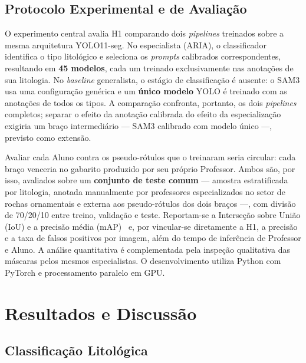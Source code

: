 \documentclass[10pt,conference]{IEEEtran}
\begin{document}
\subsection{Protocolo Experimental e de Avaliação}

O experimento central avalia H1 comparando dois \textit{pipelines} treinados sobre a mesma arquitetura YOLO11-seg. No especialista (ARIA), o classificador identifica o tipo litológico e seleciona os \textit{prompts} calibrados correspondentes, resultando em \textbf{45 modelos}, cada um treinado exclusivamente nas anotações de sua litologia. No \textit{baseline} generalista, o estágio de classificação é ausente: o SAM3 usa uma configuração genérica e um \textbf{único modelo} YOLO é treinado com as anotações de todos os tipos. A comparação confronta, portanto, os dois \textit{pipelines} completos; separar o efeito da anotação calibrada do efeito da especialização exigiria um braço intermediário --- SAM3 calibrado com modelo único ---, previsto como extensão.

Avaliar cada Aluno contra os pseudo-rótulos que o treinaram seria circular: cada braço venceria no gabarito produzido por seu próprio Professor. Ambos são, por isso, avaliados sobre um \textbf{conjunto de teste comum} --- amostra estratificada por litologia, anotada manualmente por professores especializados no setor de rochas ornamentais e externa aos pseudo-rótulos dos dois braços ---, com divisão de 70/20/10 entre treino, validação e teste. Reportam-se a Interseção sobre União (IoU) e a precisão média (mAP)~\cite{voc_everingham2010} e, por vincular-se diretamente a H1, a precisão e a taxa de falsos positivos por imagem, além do tempo de inferência de Professor e Aluno. A análise quantitativa é complementada pela inspeção qualitativa das máscaras pelos mesmos especialistas. O desenvolvimento utiliza Python com PyTorch e processamento paralelo em GPU.

\section{Resultados e Discussão}

\subsection{Classificação Litológica}
\end{document}
